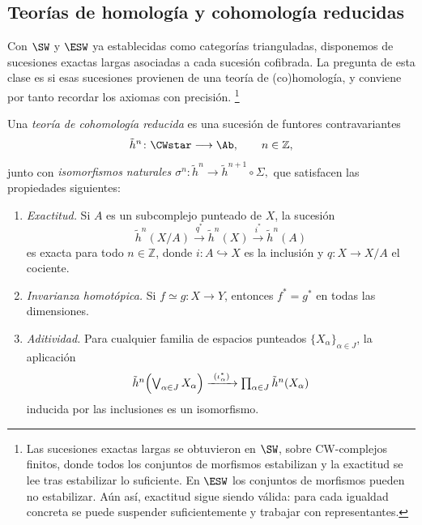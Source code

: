 \subsection{Teorías de homología y cohomología reducidas}

Con $\SW$ y $\ESW$ ya establecidas como categorías trianguladas, disponemos de sucesiones exactas largas asociadas a cada sucesión cofibrada. La pregunta de esta clase es si esas sucesiones provienen de una teoría de (co)homología, y conviene por tanto recordar los axiomas con precisión.%
\footnote{
    Las sucesiones exactas largas se obtuvieron en $\SW$, sobre CW-complejos finitos, donde todos los conjuntos de morfismos estabilizan y la exactitud se lee tras estabilizar lo suficiente. En $\ESW$ los conjuntos de morfismos pueden no estabilizar. Aún así, exactitud sigue siendo válida: para cada igualdad concreta se puede suspender suficientemente y trabajar con representantes.
}


\begin{defi}\label{defi:cohomologia-reducida}
Una \emph{teoría de cohomología reducida} es una sucesión de funtores contravariantes
\[
\tilde h^n\colon\CWstar\longrightarrow\Ab,
\qquad n\in\mathbb Z,
\]
junto con \emph{isomorfismos naturales
$\sigma^n\colon\tilde h^n\longrightarrow\tilde h^{n+1}\circ\Sigma,$}
que satisfacen las propiedades siguientes:
\begin{enumerate}[label = \textup{\arabic*.}]
\item \emph{Exactitud.} Si $A$ es un subcomplejo punteado de $X$, la sucesión
\[
\tilde h^n(X/A)\xrightarrow{\ q^*\ }\tilde h^n(X)\xrightarrow{\ i^*\ }\tilde h^n(A)
\]
es exacta para todo $n\in\mathbb Z$, donde $i\colon A\hookrightarrow X$ es la inclusión y $q\colon X\to X/A$ el cociente.

\item \emph{Invarianza homotópica.} Si $f\simeq g\colon X\to Y$, entonces $f^*=g^*$ en todas las dimensiones.

\item \emph{Aditividad.} Para cualquier familia de espacios punteados $\{X_\alpha\}_{\alpha\in J}$, la aplicación 
\[\textstyle
\tilde h^n\Bigl(\bigvee_{\alpha\in J}X_\alpha\Bigr)\xrightarrow{\ (\iota_\alpha^*)\ }\prod_{\alpha\in J}\tilde h^n(X_\alpha)
\]
inducida por las inclusiones es un isomorfismo.
\end{enumerate}
\end{defi}

